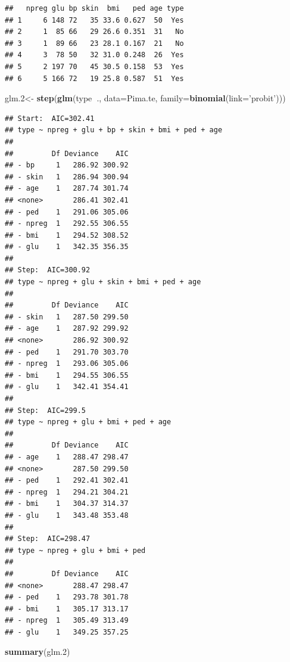 \documentclass[]{book}
\newenvironment{Shaded}{\begin{snugshade}}{\end{snugshade}}
\newcommand{\KeywordTok}[1]{\textcolor[rgb]{0.13,0.29,0.53}{\textbf{#1}}}
\newcommand{\DataTypeTok}[1]{\textcolor[rgb]{0.13,0.29,0.53}{#1}}
\newcommand{\DecValTok}[1]{\textcolor[rgb]{0.00,0.00,0.81}{#1}}
\newcommand{\StringTok}[1]{\textcolor[rgb]{0.31,0.60,0.02}{#1}}
\newcommand{\OperatorTok}[1]{\textcolor[rgb]{0.81,0.36,0.00}{\textbf{#1}}}
\newcommand{\NormalTok}[1]{#1}
\theoremstyle{definition}
\theoremstyle{definition}
\theoremstyle{definition}
\theoremstyle{remark}
\begin{document}
\begin{verbatim}
##   npreg glu bp skin  bmi   ped age type
## 1     6 148 72   35 33.6 0.627  50  Yes
## 2     1  85 66   29 26.6 0.351  31   No
## 3     1  89 66   23 28.1 0.167  21   No
## 4     3  78 50   32 31.0 0.248  26  Yes
## 5     2 197 70   45 30.5 0.158  53  Yes
## 6     5 166 72   19 25.8 0.587  51  Yes
\end{verbatim}

\begin{Shaded}
\begin{Highlighting}[]
\NormalTok{glm.}\DecValTok{2}\NormalTok{<-}\StringTok{ }\KeywordTok{step}\NormalTok{(}\KeywordTok{glm}\NormalTok{(type}\OperatorTok{~}\NormalTok{., }\DataTypeTok{data=}\NormalTok{Pima.te, }\DataTypeTok{family=}\KeywordTok{binomial}\NormalTok{(}\DataTypeTok{link=}\StringTok{'probit'}\NormalTok{)))}
\end{Highlighting}
\end{Shaded}

\begin{verbatim}
## Start:  AIC=302.41
## type ~ npreg + glu + bp + skin + bmi + ped + age
## 
##         Df Deviance    AIC
## - bp     1   286.92 300.92
## - skin   1   286.94 300.94
## - age    1   287.74 301.74
## <none>       286.41 302.41
## - ped    1   291.06 305.06
## - npreg  1   292.55 306.55
## - bmi    1   294.52 308.52
## - glu    1   342.35 356.35
## 
## Step:  AIC=300.92
## type ~ npreg + glu + skin + bmi + ped + age
## 
##         Df Deviance    AIC
## - skin   1   287.50 299.50
## - age    1   287.92 299.92
## <none>       286.92 300.92
## - ped    1   291.70 303.70
## - npreg  1   293.06 305.06
## - bmi    1   294.55 306.55
## - glu    1   342.41 354.41
## 
## Step:  AIC=299.5
## type ~ npreg + glu + bmi + ped + age
## 
##         Df Deviance    AIC
## - age    1   288.47 298.47
## <none>       287.50 299.50
## - ped    1   292.41 302.41
## - npreg  1   294.21 304.21
## - bmi    1   304.37 314.37
## - glu    1   343.48 353.48
## 
## Step:  AIC=298.47
## type ~ npreg + glu + bmi + ped
## 
##         Df Deviance    AIC
## <none>       288.47 298.47
## - ped    1   293.78 301.78
## - bmi    1   305.17 313.17
## - npreg  1   305.49 313.49
## - glu    1   349.25 357.25
\end{verbatim}

\begin{Shaded}
\begin{Highlighting}[]
\KeywordTok{summary}\NormalTok{(glm.}\DecValTok{2}\NormalTok{)}
\end{Highlighting}
\end{Shaded}
\end{document}
